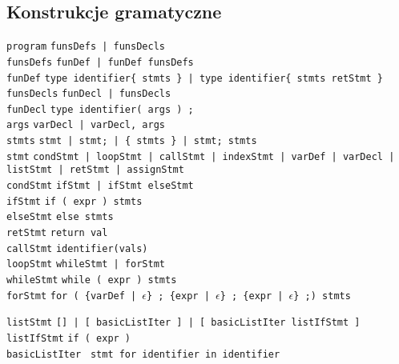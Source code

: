 \documentclass{article}
\newcommand{\keyword}[1]{\colorbox{light-gray}{\texttt{#1}}}
\newcommand{\code}[1]{\texttt{#1}}
\begin{document}
\subsection{Konstrukcje gramatyczne}
\code{program} \textrightarrow \code{funsDefs | funsDecls} \\
\code{funsDefs} \textrightarrow \code{funDef | funDef funsDefs} \\
\code{funDef} \textrightarrow \code{type identifier\{ stmts \} | type identifier\{ stmts retStmt \}} \\
\code{funsDecls} \textrightarrow \code{funDecl | funsDecls} \\
\code{funDecl} \textrightarrow \code{type identifier( args ) \keyword{;}} \\
\code{args} \textrightarrow \code{varDecl | varDecl, args} \\
\code{stmts} \textrightarrow \code{stmt | stmt\keyword{;} | \keyword{\{} stmts \keyword{\}} | stmt\keyword{;} stmts} \\
\code{stmt} \textrightarrow \code{condStmt | loopStmt | callStmt | indexStmt | varDef | varDecl | listStmt | retStmt | assignStmt} \\

\code{condStmt} \textrightarrow \code{ifStmt | ifStmt elseStmt} \\
\code{ifStmt} \textrightarrow \code{\keyword{if (} expr \keyword{)} stmts } \\
\code{elseStmt} \textrightarrow \code{\keyword{else} stmts} \\
\code{retStmt} \textrightarrow \code{\keyword{return} val} \\
\code{callStmt} \textrightarrow \code{identifier\keyword{(}vals\keyword{)}} \\

\code{loopStmt} \textrightarrow \code{whileStmt | forStmt} \\
\code{whileStmt} \textrightarrow \code{\keyword{while (} expr \keyword{)} stmts} \\
\code{forStmt} \textrightarrow \code{\keyword{for (} \{varDef | $\epsilon$\} \keyword{;} \{expr | $\epsilon$\} \keyword{;} \{expr | $\epsilon$\} \keyword{;)} stmts}

\code{listStmt} \textrightarrow \code{\keyword{[]} | \keyword{[} basicListIter \keyword{]} | \keyword{[} basicListIter listIfStmt \keyword{]} } \\
\code{listIfStmt} \textrightarrow \code{\keyword{if (} expr \keyword{)}} \\
\code{basicListIter} \textrightarrow \code{ stmt \keyword{for} identifier \keyword{in} identifier} \\
\end{document}
